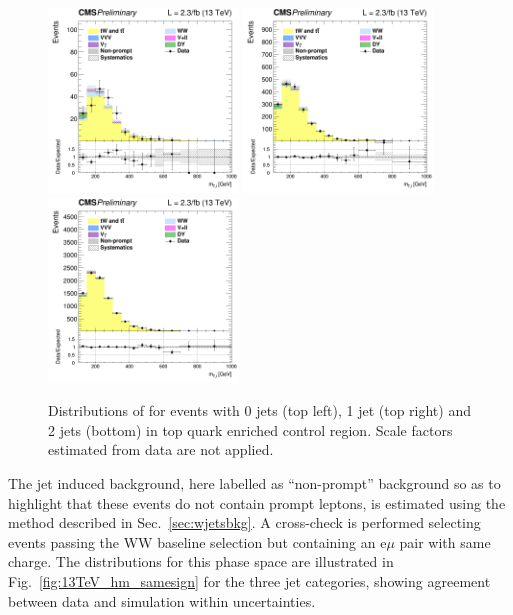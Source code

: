 \begin{figure}[!htb]
\centering
\includegraphics[width=0.45\textwidth]{images/13TeV/HighMass/cratio_hww2l2v_13TeV_top_of0j_mTi.png}
\includegraphics[width=0.45\textwidth]{images/13TeV/HighMass/cratio_hww2l2v_13TeV_top_of1j_mTi.png}
\includegraphics[width=0.45\textwidth]{images/13TeV/HighMass/cratio_hww2l2v_13TeV_top_of2j_mTi.png}
\caption{
Distributions of \mti for events with 0 jets (top left), 1 jet (top right)
and 2 jets (bottom) in top quark enriched control region.
Scale factors estimated from data are not applied. %
}
\label{fig:TopCtrl}
\end{figure}

The jet induced background, here labelled as ``non-prompt'' background so as to highlight that these events do not contain prompt leptons, is estimated using the method described in Sec.~\ref{sec:wjetsbkg}. A cross-check is performed selecting events passing the WW baseline selection but containing an e$\mu$ pair with same charge. The \mti distributions for this phase space are illustrated in Fig.~\ref{fig:13TeV_hm_samesign} for the three jet categories, showing agreement between data and simulation within uncertainties.

